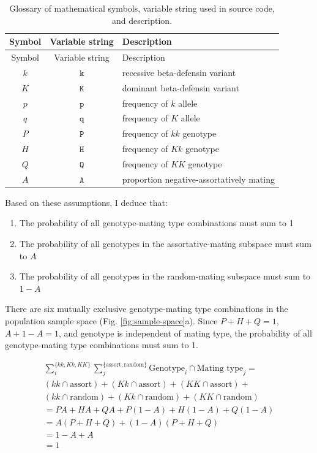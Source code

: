 \documentclass[
]{article}
\providecommand{\tightlist}{%
  \setlength{\itemsep}{0pt}\setlength{\parskip}{0pt}}
\begin{document}
\begin{longtable}[]{@{}ccl@{}}
\caption{\label{tab:symbols}Glossary of mathematical symbols, variable string used in source code, and description.}\tabularnewline
\toprule()
Symbol & Variable string & Description \\
\midrule()
\endfirsthead
\toprule()
Symbol & Variable string & Description \\
\midrule()
\endhead
\(k\) & \(\mathtt{k}\) & recessive beta-defensin variant \\
\(K\) & \(\mathtt{K}\) & dominant beta-defensin variant \\
\(p\) & \(\mathtt{p}\) & frequency of \(\textit{k}\) allele \\
\(q\) & \(\mathtt{q}\) & frequency of \(\textit{K}\) allele \\
\(P\) & \(\mathtt{P}\) & frequency of \(\textit{kk}\) genotype \\
\(H\) & \(\mathtt{H}\) & frequency of \(\textit{Kk}\) genotype \\
\(Q\) & \(\mathtt{Q}\) & frequency of \(\textit{KK}\) genotype \\
\(A\) & \(\mathtt{A}\) & proportion negative-assortatively mating \\
\bottomrule()
\end{longtable}

Based on these assumptions, I deduce that:

\begin{enumerate}
\def\labelenumi{\arabic{enumi}.}
\tightlist
\item
  The probability of all genotype-mating type combinations must sum to 1
\item
  The probability of all genotypes in the assortative-mating subspace must sum to \(A\)
\item
  The probability of all genotypes in the random-mating subspace must sum to \(1-A\)
\end{enumerate}

There are six mutually exclusive genotype-mating type combinations in the population sample space (Fig. \ref{fig:sample-space}a). Since \(P+H+Q=1\), \(A + 1 - A = 1\), and genotype is independent of mating type, the probability of all genotype-mating type combinations must sum to 1.

\begin{multline*}
 \sum_i^{\{\mathit{kk}, \mathit{Kk}, \mathit{KK}\}} \sum_j^{\{\textrm{assort}, \textrm{random}\}} \textrm{Genotype}_i \cap \textrm{Mating~type}_j = \\  
  (\mathit{kk} \cap \textrm{assort}) + (\mathit{Kk} \cap \textrm{assort}) + 
  (\mathit{KK} \cap \textrm{assort}) + \\ (\mathit{kk} \cap \textrm{random}) + 
  (\mathit{Kk} \cap \textrm{random}) + (\mathit{KK} \cap \textrm{random}) \\
 = PA + HA + QA + P (1 - A) + H (1 - A) + Q (1 - A) \\
 = A (P + H + Q) + (1 - A) (P + H + Q) \\
 = 1 - A + A \\
 = 1 \\
\end{multline*}
\end{document}

